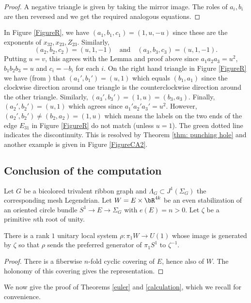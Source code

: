 \begin{proof}
A negative triangle is given by taking the mirror image. The roles of $a_i,b_i$ are then reversed and we get the required analogous equations.
\end{proof}
\begin{example}
In Figure \ref{FigureR}, we have $(a_1,b_1,c_1)=(1,u,-u)$ since these are the expo\-nents of $x_{32},x_{23}, Z_{23}$. Similarly,
\[
(a_2,b_2,c_2)=(u,1,-1)\quad\text{and}\quad(a_3,b_3,c_3)=(u,1,-1).
\]
Putting $u=v$, this agrees with the Lemma and proof above since $a_1a_2a_3=u^2$, $b_1b_2b_3=u$ and $c_i=-b_i$ for each $i$. On the right hand triangle in Figure \ref{FigureR} we have (from \cite{IK93}) that $(a_1',b_1')=(u,1)$ which equals $(b_1,a_1)$ since the clockwise direction around one triangle is the counterclockwise direction around the other triangle. Similarly, $(a_3',b_3')=(1,u)=(b_3,a_3)$. Finally, $(a_2',b_2')=(u,1)$ which agrees since $a_1'a_2'a_3'=u^2$. However, $(a_2',b_2')\neq (b_2,a_2)=(1,u)$ which means the labels on the two ends of the edge $E_{31}$ in Figure \ref{FigureR} do not match (unless $u=1$). The green dotted line indicates the discontinuity. This is resolved by Theorem \ref{thm: punching hole} and another example is given in Figure \ref{FigureCA2}.
\end{example}

\subsection{Conclusion of the computation} Let $G$ be a bicolored trivalent ribbon graph and $\Lambda_G\subset J^1(\Sigma_G)$ the corresponding mesh Legendrian. Let $W=E \times \bR^{4k}$ be an even stabilization of an oriented circle bundle $S^1 \to E \to \Sigma_G$ with $e(E)=n>0$. Let $\zeta$ be a primitive $n$th root of unity.

\begin{lemma}
There is a rank $1$ unitary local system $\rho:\pi_1W\to U(1)$ whose image is generated by $\zeta$ so that $\rho$ sends the preferred generator of $\pi_1S^1$ to $\zeta^{-1}$.
\end{lemma}

\begin{proof}
There is a fiberwise $n$-fold cyclic covering of $E$, hence also of $W$. The holonomy of this covering gives the representation.
\end{proof}

We now give the proof of Theorems \ref{euler} and \ref{calculation}, which we recall for convenience.

